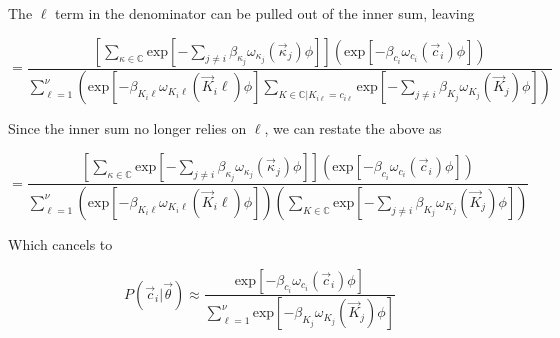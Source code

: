 \documentclass[11pt]{article} %
\begin{document}
The $\ell$ term in the denominator can be pulled out of the inner sum, leaving

\[
=
\frac{
\left[
\sum _{\kappa \in \mathbb{C}}
\mbox{exp}\left[-\sum_{j\neq i} \beta_{\kappa_j} \omega_{\kappa_j} (\vec{\kappa}_j) \phi \right]
\right]
\left(\mbox{exp}\left[-\beta_{c_i} \omega_{c_i} (\vec{c}_i) \phi \right]\right)
}{
\sum_{\ell=1}^\nu
\left(
\mbox{exp}\left[-\beta_{K_i\ell} \omega_{K_i\ell} (\vec{K}_i\ell) \phi \right]
\sum _{K \in \mathbb{C} | K_{i\ell} = c_{i\ell}}
\mbox{exp}\left[-\sum_{j\neq i} \beta_{K_j} \omega_{K_j} (\vec{K}_j) \phi \right]
\right)
}
\]

Since the inner sum no longer relies on $\ell$, we can restate the above as 

\[
=
\frac{
\left[
\sum _{\kappa \in \mathbb{C}}
\mbox{exp}\left[-\sum_{j\neq i} \beta_{\kappa_j} \omega_{\kappa_j} (\vec{\kappa}_j) \phi \right]
\right]
\left(\mbox{exp}\left[-\beta_{c_i} \omega_{c_i} (\vec{c}_i) \phi \right]\right)
}{
\sum_{\ell=1}^\nu
\left(
\mbox{exp}\left[-\beta_{K_i\ell} \omega_{K_i\ell} (\vec{K}_i\ell) \phi \right]
\right)\left(
\sum _{K \in \mathbb{C}}
\mbox{exp}\left[-\sum_{j\neq i} \beta_{K_j} \omega_{K_j} (\vec{K}_j) \phi \right]
\right)
}
\]


Which cancels to


\[
P(\vec{c}_i | \vec{\theta})
\approx
\frac{
\mbox{exp}\left[-\beta_{c_i} \omega_{c_i} (\vec{c}_i) \phi \right]
}{
\sum_{\ell=1}^\nu
\mbox{exp}\left[-\beta_{K_j} \omega_{K_j} (\vec{K}_j) \phi \right]
}
\]

%
\end{document}

